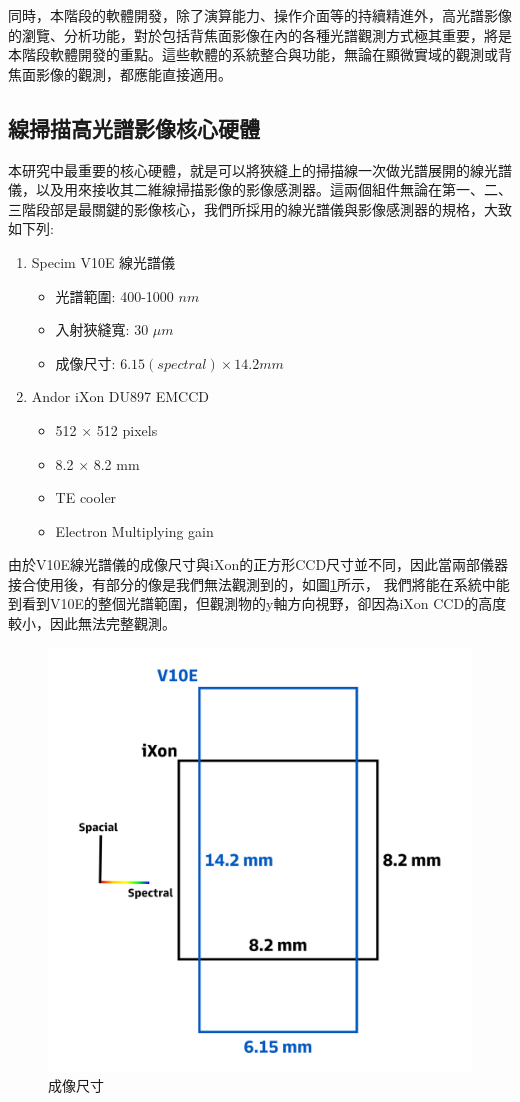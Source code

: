 \documentclass[12pt]{article}
\begin{document}
同時，本階段的軟體開發，除了演算能力、操作介面等的持續精進外，高光譜影像的瀏覽、分析功能，對於包括背焦面影像在內的各種光譜觀測方式極其重要，將是本階段軟體開發的重點。這些軟體的系統整合與功能，無論在顯微實域的觀測或背焦面影像的觀測，都應能直接適用。

\subsection{線掃描高光譜影像核心硬體}
本研究中最重要的核心硬體，就是可以將狹縫上的掃描線一次做光譜展開的線光譜儀，以及用來接收其二維線掃描影像的影像感測器。這兩個組件無論在第一、二、三階段部是最關鍵的影像核心，我們所採用的線光譜儀與影像感測器的規格，大致如下列:
\begin{enumerate}
    \item Specim V10E 線光譜儀
          \begin{itemize}
              \item 光譜範圍: 400-1000 $nm$
              \item 入射狹縫寬: 30 $\mu m$
              \item 成像尺寸: $6.15(spectral) \times 14.2 mm$
          \end{itemize}
    \item Andor iXon DU897 EMCCD
          \begin{itemize}
              \item 512 $\times$ 512 pixels
              \item 8.2 $\times$ 8.2 mm
              \item TE cooler
              \item Electron Multiplying gain
          \end{itemize}
\end{enumerate}
由於V10E線光譜儀的成像尺寸與iXon的正方形CCD尺寸並不同，因此當兩部儀器接合使用後，有部分的像是我們無法觀測到的，如圖\ref{figure: image size}所示，
我們將能在系統中能到看到V10E的整個光譜範圍，但觀測物的y軸方向視野，卻因為iXon CCD的高度較小，因此無法完整觀測。

\begin{figure}[h]
    \centering
    \includegraphics[width=0.5\linewidth]{imagesize.jpg}
    \caption{成像尺寸}
    \label{figure: image size}
\end{figure}
\end{document}
